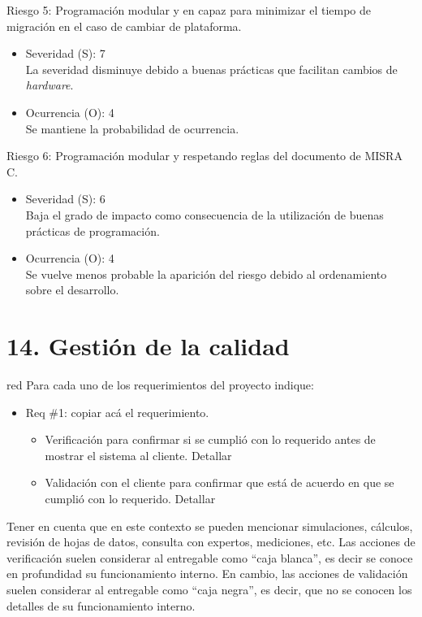 \documentclass[
11pt, %
]{charter}
\begin{document}
Riesgo 5: Programación modular y en capaz para minimizar el tiempo de migración en el caso de cambiar de plataforma.
\begin{itemize}
	\item Severidad (S): 7\\
	La severidad disminuye debido a buenas prácticas que facilitan cambios de \textit{hardware}. 
	\item Ocurrencia (O): 4\\
	Se mantiene la probabilidad de ocurrencia.
\end{itemize}

Riesgo 6: Programación modular y respetando reglas del documento de MISRA C.
\begin{itemize}
	\item Severidad (S): 6\\
	Baja el grado de impacto como consecuencia de la utilización de buenas prácticas de programación.
	\item Ocurrencia (O): 4\\
	Se vuelve menos probable la aparición del riesgo debido al ordenamiento sobre el desarrollo.
	
\end{itemize}

\section{14. Gestión de la calidad}
\label{sec:calidad}

\begin{consigna}{red}
Para cada uno de los requerimientos del proyecto indique:
\begin{itemize} 
\item Req \#1: copiar acá el requerimiento.

\begin{itemize}
	\item Verificación para confirmar si se cumplió con lo requerido antes de mostrar el sistema al cliente. Detallar 
	\item Validación con el cliente para confirmar que está de acuerdo en que se cumplió con lo requerido. Detallar  
\end{itemize}

\end{itemize}

Tener en cuenta que en este contexto se pueden mencionar simulaciones, cálculos, revisión de hojas de datos, consulta con expertos, mediciones, etc.  Las acciones de verificación suelen considerar al entregable como ``caja blanca'', es decir se conoce en profundidad su funcionamiento interno.  En cambio, las acciones de validación suelen considerar al entregable como ``caja negra'', es decir, que no se conocen los detalles de su funcionamiento interno.

\end{consigna}
\end{document}
